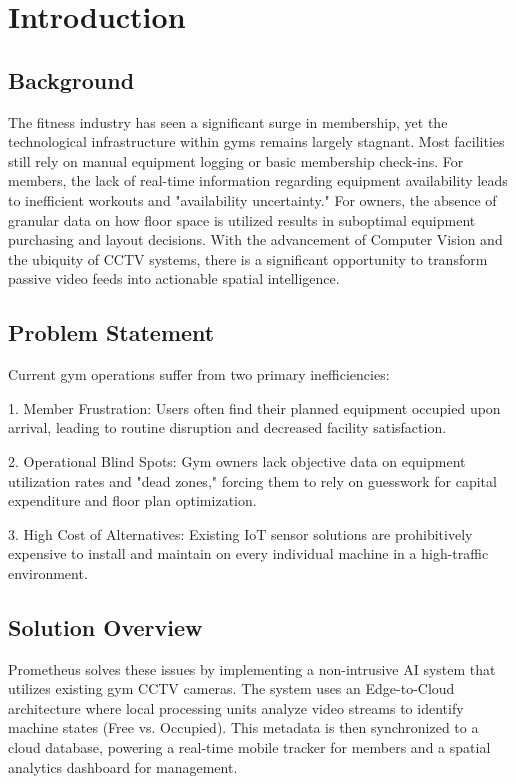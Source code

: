 \chapter{Introduction}
\label{chap:introduction}

\section{Background}
\label{section:background}

The fitness industry has seen a significant surge in membership, yet the technological 
infrastructure within gyms remains largely stagnant. Most facilities still rely on manual 
equipment logging or basic membership check-ins. For members, the lack of real-time information 
regarding equipment availability leads to inefficient workouts and "availability uncertainty." 
For owners, the absence of granular data on how floor space is utilized results in suboptimal 
equipment purchasing and layout decisions. With the advancement of Computer Vision and the ubiquity 
of CCTV systems, there is a significant opportunity to transform passive video feeds into actionable 
spatial intelligence.

\section{Problem Statement}
\label{section:problem-statement}

Current gym operations suffer from two primary inefficiencies:

1. Member Frustration: Users often find their planned equipment occupied upon arrival, 
leading to routine disruption and decreased facility satisfaction.

2. Operational Blind Spots: Gym owners lack objective data on equipment utilization 
rates and "dead zones," forcing them to rely on guesswork for capital expenditure and floor plan optimization.

3. High Cost of Alternatives: Existing IoT sensor solutions are prohibitively expensive 
to install and maintain on every individual machine in a high-traffic environment.

\section{Solution Overview}
\label{section:solution-overview}

Prometheus solves these issues by implementing a non-intrusive AI system that utilizes existing 
gym CCTV cameras. The system uses an Edge-to-Cloud architecture where local processing units 
analyze video streams to identify machine states (Free vs. Occupied). This metadata is then 
synchronized to a cloud database, powering a real-time mobile tracker for members and a spatial 
analytics dashboard for management.

